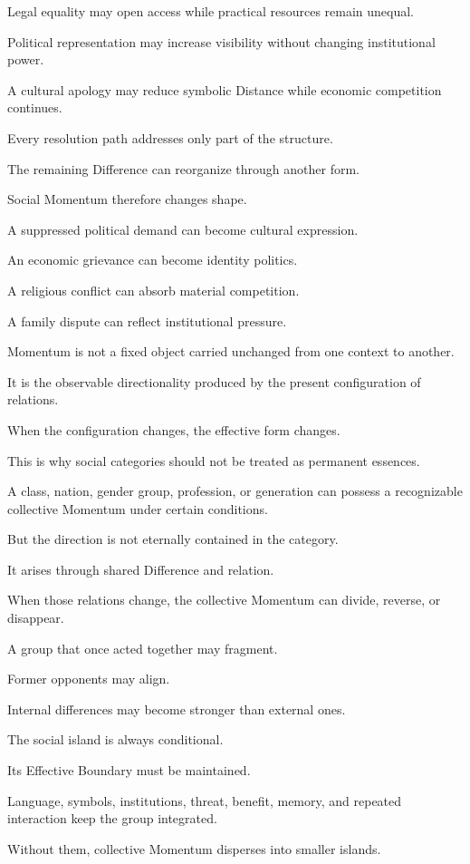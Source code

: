 Legal equality may open access while practical resources remain unequal.

Political representation may increase visibility without changing institutional power.

A cultural apology may reduce symbolic Distance while economic competition continues.

Every resolution path addresses only part of the structure.

The remaining Difference can reorganize through another form.

Social Momentum therefore changes shape.

A suppressed political demand can become cultural expression.

An economic grievance can become identity politics.

A religious conflict can absorb material competition.

A family dispute can reflect institutional pressure.

Momentum is not a fixed object carried unchanged from one context to another.

It is the observable directionality produced by the present configuration of relations.

When the configuration changes, the effective form changes.

This is why social categories should not be treated as permanent essences.

A class, nation, gender group, profession, or generation can possess a recognizable collective Momentum under certain conditions.

But the direction is not eternally contained in the category.

It arises through shared Difference and relation.

When those relations change, the collective Momentum can divide, reverse, or disappear.

A group that once acted together may fragment.

Former opponents may align.

Internal differences may become stronger than external ones.

The social island is always conditional.

Its Effective Boundary must be maintained.

Language, symbols, institutions, threat, benefit, memory, and repeated interaction keep the group integrated.

Without them, collective Momentum disperses into smaller islands.

